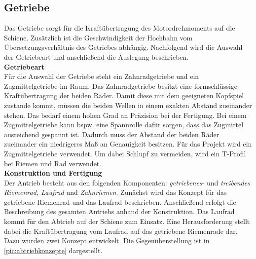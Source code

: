 \subsection{Getriebe}
\label{sec:getriebekonzept}
Das Getriebe sorgt für die Kraftübertragung des Motordrehmoments auf die Schiene. Zusätzlich ist die Geschwindigkeit der Hochbahn vom Übersetzungsverhältnis des Getriebes abhängig. Nachfolgend wird die Auswahl der Getriebeart und anschließend die Auslegung beschrieben. \\

\textbf{Getriebeart}\\
Für die Auswahl der Getriebe steht ein Zahnradgetriebe und ein Zugmittelgetriebe im Raum. Das Zahnradgetriebe besitzt eine formschlüssige Kraftübertragung der beiden Räder. Damit diese mit dem geeigneten Kopfspiel zustande kommt, müssen die beiden Wellen in einem exakten Abstand zueinander stehen. Das bedarf einem hohen Grad an Präzision bei der Fertigung. Bei einem Zugmittelgetriebe kann bspw. eine Spannrolle dafür sorgen, dass das Zugmittel ausreichend gespannt ist. Dadurch muss der Abstand der beiden Räder zueinander ein niedrigeres Maß an Genauigkeit besitzen. 
Für das Projekt wird ein Zugmittelgetriebe verwendet. Um dabei Schlupf zu vermeiden, wird ein T-Profil bei Riemen und Rad verwendet. 
\\

\textbf{Konstruktion und Fertigung}\\
Der Antrieb besteht aus den folgenden Komponenten: \textit{getriebenes}- und \textit{treibendes Riemenrad, Laufrad} und \textit{Zahnriemen}. Zunächst wird das Konzept für das getriebene Riemenrad und das Laufrad beschrieben. Anschließend erfolgt die Beschreibung des gesamten Antriebs anhand der Konstruktion.  
Das Laufrad kommt für den Abtrieb auf der Schiene zum Einsatz. Eine Herausforderung stellt dabei die Kraftübertragung vom Laufrad auf das getriebene Riemenrade dar. Dazu wurden zwei Konzept entwickelt. Die Gegenüberstellung ist in \autoref{pic:abtriebkonzepte} dargestellt.
\newpage

